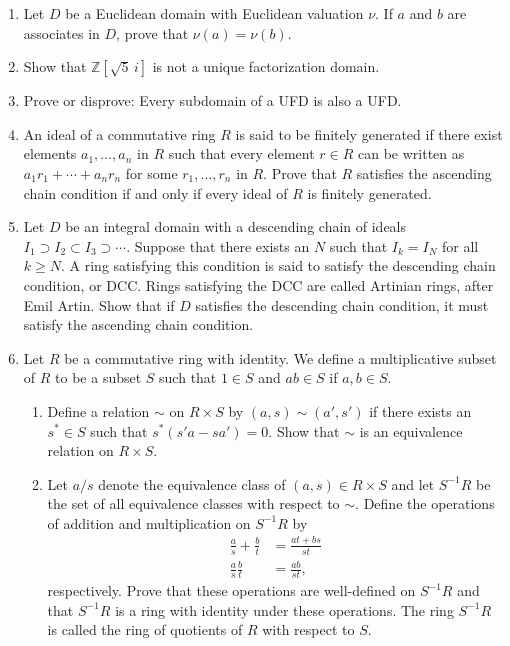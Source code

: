 {\begin{enumerate}
\item
Let $D$ be a Euclidean domain with Euclidean valuation $\nu$.  If $a$
and $b$ are associates in $D$, prove that $\nu(a) = \nu(b)$.


\item
Show that ${\mathbb Z}[\sqrt{5}\, i]$ is not a unique factorization domain.



\item
Prove or disprove:  Every subdomain of a UFD is also a UFD.


\item
An ideal of a commutative ring $R$ is said to be {\bfi finitely
generated\/} if there exist elements
$a_1, \ldots, a_n$ in $R$ such that every element $r \in R$ can be
written as $a_1 r_1 + \cdots + a_n r_n$ for some $r_1, \ldots, r_n$ in
$R$.  Prove that $R$ satisfies the ascending chain condition if and
only if every ideal of $R$ is finitely generated.  


\item
Let $D$ be an integral domain with a descending chain of ideals $I_1
\supset I_2 \subset I_3 \supset \cdots$.  Suppose that there exists an $N$ such that
$I_k = I_N$ for all $k \geq N$. A ring satisfying this condition is
said to satisfy the {\bfi descending chain condition}, or {\bfi DCC}. Rings satisfying the DCC are called
{\bfi Artinian rings}, after Emil
Artin.  Show that if $D$ satisfies the descending chain condition, it must satisfy the ascending chain condition.


\item
Let $R$ be a commutative ring with identity. We define a {\bfi
multiplicative subset\/} of $R$ to be a
subset $S$ such that $1 \in S$ and $ab \in S$ if $a, b \in S$. 
\begin{enumerate}

 \item
Define a relation $\sim$ on $R \times S$ by $(a, s) \sim (a', s')$ if
there exists an $s^\ast \in S$ such that $s^\ast(s' a -s a') =0$. Show that
$\sim$ is an equivalence relation on $R \times S$.
 
 
 \item
Let $a/s$ denote the equivalence class of $(a,s) \in R \times S$ and
let $ S^{-1}R$ be the set of all equivalence classes with respect to
$\sim$.  Define  the operations of addition and multiplication on
$S^{-1} R$ by
\begin{align*}
\frac{a}{s} + \frac{b}{t} & = \frac{at + b s}{s t} \\
\frac{a}{s}  \frac{b}{t} & = \frac{a b}{s t},
\end{align*}
respectively. Prove that these operations are well-defined on $S^{-1}R$
and that $S^{-1}R$ is a ring with identity under these operations.
The ring $S^{-1}R$ is called the {\bfi ring of
quotients\/} of $R$ with respect to $S$.



\end{enumerate}
\end{enumerate}}

